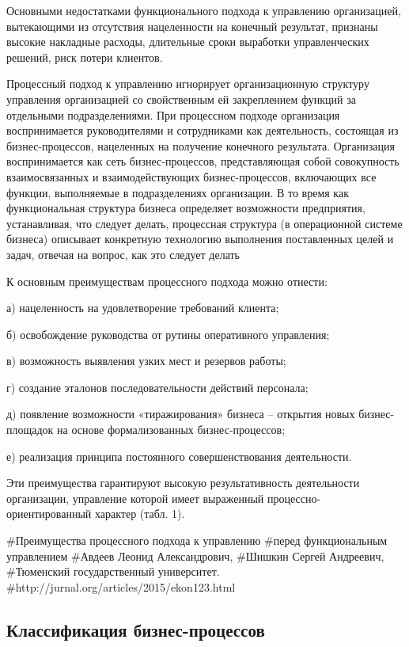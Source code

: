 \documentclass{../industrial-development}
\begin{document}
Основными недостатками функционального подхода к управлению организацией, вытекающими из отсутствия нацеленности на конечный результат, признаны высокие накладные расходы, длительные сроки выработки управленческих решений, риск потери клиентов.

Процессный подход к управлению игнорирует организационную структуру управления организацией со свойственным ей закреплением функций за отдельными подразделениями. При процессном подходе организация воспринимается руководителями и сотрудниками как деятельность, состоящая из бизнес-процессов, нацеленных на получение конечного результата. Организация воспринимается как сеть бизнес-процессов, представляющая собой совокупность взаимосвязанных и взаимодействующих бизнес-процессов, включающих все функции, выполняемые в подразделениях организации. В то время как функциональная структура бизнеса определяет возможности предприятия, устанавливая, что следует делать, процессная структура (в операционной системе бизнеса) описывает конкретную технологию выполнения поставленных целей и задач, отвечая на вопрос, как это следует делать

К основным преимуществам процессного подхода можно отнести:

а) нацеленность на удовлетворение требований клиента;

б) освобождение руководства от рутины оперативного управления;

в) возможность выявления узких мест и резервов работы;

г) создание эталонов последовательности действий персонала;

д) появление возможности «тиражирования» бизнеса – открытия новых бизнес-площадок на основе формализованных бизнес-процессов;

е) реализация принципа постоянного совершенствования деятельности.

Эти преимущества гарантируют высокую результативность деятельности организации, управление которой имеет выраженный процессно-ориентированный характер (табл. 1).

#Преимущества процессного подхода к управлению #перед функциональным управлением
#Авдеев Леонид Александрович,
#Шишкин Сергей Андреевич,
#Тюменский государственный университет.
#http://jurnal.org/articles/2015/ekon123.html


\subsection{Классификация бизнес-процессов}
\end{document}
